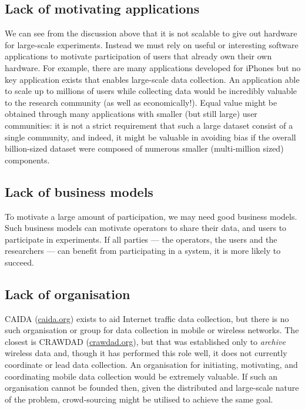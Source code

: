 \documentclass{sig-alternate-10pt}
\begin{document}
\subsection{Lack of motivating applications}
\vspace{-1mm}
We can see from the discussion above that it is not scalable to give
out hardware for large-scale experiments.  Instead we must rely on
useful or interesting software applications to motivate participation
of users that already own their own hardware.  For example, there are
many applications developed for iPhones but no key application exists
that enables large-scale data collection.  An application able to
scale up to millions of users while collecting data would be
incredibly valuable to the research community (as well as
economically!).  Equal value might be obtained through many
applications with smaller (but still large) user communities: it is
not a strict requirement that such a large dataset consist of a single
community, and indeed, it might be valuable in avoiding bias if the
overall billion-sized dataset were composed of numerous smaller
(multi-million sized) components.
\vspace{-1mm}
\subsection{Lack of business models}
\vspace{-1mm}
To motivate a large amount of participation, we may need good business
models. Such business models can motivate operators to share their
data, and users to participate in experiments.
If all parties --- the operators, the
users and the researchers --- can benefit from participating in a
system, it is more likely to succeed.
\vspace{-1mm}
\subsection{Lack of organisation}
\vspace{-1mm}
CAIDA (\url{caida.org}) exists to aid Internet
traffic data collection, but there is no such organisation or group for
data collection in mobile or wireless networks.
The closest is CRAWDAD (\url{crawdad.org}), but that was established only to \emph{archive}
wireless data and, though it has performed this role well, it
does not currently coordinate or lead data collection.  An
organisation for initiating, motivating, and coordinating
mobile data collection would be extremely valuable.  If such an
organisation cannot be founded then, given the distributed and
large-scale nature of the problem, crowd-sourcing might be utilised to
achieve the same goal.
\vspace{-2mm}
\end{document}
